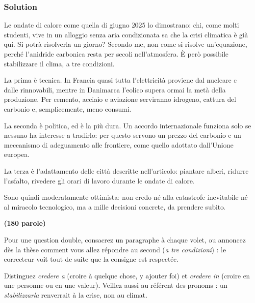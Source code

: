 \documentclass[11pt,a4paper]{article}
\begin{document}
\hypertarget{solution-13}{%
\subsubsection{Solution}\label{solution-13}}

Le ondate di calore come quella di giugno 2025 lo dimostrano: chi, come molti studenti, vive in un alloggio senza aria condizionata sa che la crisi climatica è già qui. Si potrà risolverla un giorno? Secondo me, non come si risolve un'equazione, perché l'anidride carbonica resta per secoli nell'atmosfera. È però possibile stabilizzare il clima, a tre condizioni.

La prima è tecnica. In Francia quasi tutta l'elettricità proviene dal nucleare e dalle rinnovabili, mentre in Danimarca l'eolico supera ormai la metà della produzione. Per cemento, acciaio e aviazione serviranno idrogeno, cattura del carbonio e, semplicemente, meno consumi.

La seconda è politica, ed è la più dura. Un accordo internazionale funziona solo se nessuno ha interesse a tradirlo: per questo servono un prezzo del carbonio e un meccanismo di adeguamento alle frontiere, come quello adottato dall'Unione europea.

La terza è l'adattamento delle città descritte nell'articolo: piantare alberi, ridurre l'asfalto, rivedere gli orari di lavoro durante le ondate di calore.

Sono quindi moderatamente ottimista: non credo né alla catastrofe inevitabile né al miracolo tecnologico, ma a mille decisioni concrete, da prendere subito.

\textbf{(180 parole)}

\begin{methode}

Pour une question double, consacrez un paragraphe à chaque volet, ou annoncez dès la thèse comment vous allez répondre au second (\emph{a tre condizioni}) : le correcteur voit tout de suite que la consigne est respectée.

\end{methode}

\begin{piege}

Distinguez \emph{credere a} (croire à quelque chose, y ajouter foi) et \emph{credere in} (croire en une personne ou en une valeur). Veillez aussi au référent des pronoms : un \emph{stabilizzarla} renverrait à la crise, non au climat.

\end{piege}
\end{document}
